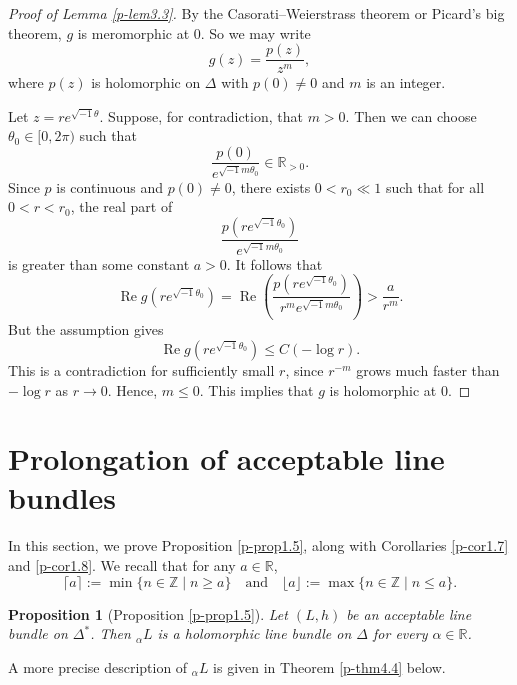 \documentclass[12pt,twoside]{amsart}
\DeclareMathOperator{\re}{Re}
\newtheorem{prop}[thm]{Proposition}
\theoremstyle{definition}
\begin{document}
\begin{proof}[Proof of Lemma \ref{p-lem3.3}]
By the Casorati--Weierstrass theorem or Picard's big 
theorem, $g$ is meromorphic at $0$. So we may write 
\[
g(z) = \frac{p(z)}{z^m},
\]
where $p(z)$ is holomorphic on $\Delta$ with $p(0) \neq 0$ and $m$ is an integer.

Let $z = r e^{\sqrt{-1}\theta}$. Suppose, for contradiction, 
that $m > 0$. Then we can choose $\theta_0 \in [0, 2\pi)$ such that
\[
\frac{p(0)}{e^{\sqrt{-1} m \theta_0}} \in \mathbb{R}_{> 0}.
\]
Since $p$ is continuous 
and $p(0) \neq 0$, there exists $0 < r_0 \ll 1$ 
such that for all $0 < r < r_0$, the real part of
\[
\frac{p(r e^{\sqrt{-1}\theta_0})}{e^{\sqrt{-1} m \theta_0}}
\]
is greater than some constant $a > 0$. It follows that
\[
\re g(r e^{\sqrt{-1}\theta_0}) = \re 
\left( \frac{p(r e^{\sqrt{-1}\theta_0})}
{r^m e^{\sqrt{-1} m \theta_0}} \right) > \frac{a}{r^m}.
\]
But the assumption gives
\[
\re g(r e^{\sqrt{-1}\theta_0}) \leq C (-\log r).
\]
This is a contradiction for sufficiently small $r$, 
since $r^{-m}$ grows much faster than $-\log r$ as $r \to 0$. Hence, $m \leq 0$. 
This implies that $g$ is holomorphic at $0$. 
\end{proof}

\section{Prolongation of acceptable line bundles}\label{p-sec4}

In this section, we prove 
Proposition \ref{p-prop1.5}, along with Corollaries \ref{p-cor1.7} and 
\ref{p-cor1.8}.  
We recall that for any \( a \in \mathbb{R} \),
\[
\lceil a \rceil := \min \{ n \in \mathbb{Z} \mid n \geq a \} \quad \text{and} \quad 
\lfloor a \rfloor := \max \{ n \in \mathbb{Z} \mid n \leq a \}.
\]

\begin{prop}[Proposition \ref{p-prop1.5}]\label{p-prop4.1} 
Let $(L, h)$ be an acceptable line bundle 
on $\Delta^*$. 
Then ${}_\alpha L$ 
is a holomorphic line bundle 
on $\Delta$ for every $\alpha \in \mathbb R$. 
\end{prop}

A more precise description of ${}_\alpha L$ is given in Theorem \ref{p-thm4.4} below. 
\end{document}
